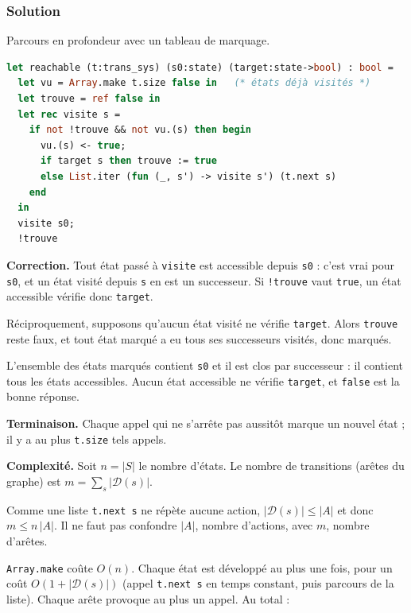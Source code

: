 \documentclass[11pt,a4paper]{article}
\newcommand{\equationajustee}[1]{%
  \sbox{\boiteequation}{$\displaystyle #1$}%
  \ifdim\wd\boiteequation>\linewidth
    \[\resizebox{\linewidth}{!}{\usebox{\boiteequation}}\]%
  \else
    \[#1\]%
  \fi}
\begin{document}
\hypertarget{solution-4}{%
\subsubsection{Solution}\label{solution-4}}

Parcours en profondeur avec un tableau de marquage.

\begin{lstlisting}[language=Caml]
let reachable (t:trans_sys) (s0:state) (target:state->bool) : bool =
  let vu = Array.make t.size false in   (* états déjà visités *)
  let trouve = ref false in
  let rec visite s =
    if not !trouve && not vu.(s) then begin
      vu.(s) <- true;
      if target s then trouve := true
      else List.iter (fun (_, s') -> visite s') (t.next s)
    end
  in
  visite s0;
  !trouve
\end{lstlisting}

\textbf{Correction.} Tout état passé à \texttt{visite} est accessible depuis \texttt{s0} : c'est vrai pour \texttt{s0}, et un état visité depuis \texttt{s} en est un successeur. Si \texttt{!trouve} vaut \texttt{true}, un état accessible vérifie donc \texttt{target}.

Réciproquement, supposons qu'aucun état visité ne vérifie \texttt{target}. Alors \texttt{trouve} reste faux, et tout état marqué a eu tous ses successeurs visités, donc marqués.

L'ensemble des états marqués contient \texttt{s0} et il est clos par successeur : il contient tous les états accessibles. Aucun état accessible ne vérifie \texttt{target}, et \texttt{false} est la bonne réponse.

\textbf{Terminaison.} Chaque appel qui ne s'arrête pas aussitôt marque un nouvel état ; il y a au plus \texttt{t.size} tels appels.

\textbf{Complexité.} Soit \(n=|S|\) le nombre d'états. Le nombre de transitions (arêtes du graphe) est \(m=\sum_s|\mathcal D(s)|\).

Comme une liste \texttt{t.next\ s} ne répète aucune action, \(|\mathcal D(s)|\le|A|\) et donc \(m\le n\,|A|\). Il ne faut pas confondre \(|A|\), nombre d'actions, avec \(m\), nombre d'arêtes.

\texttt{Array.make} coûte \(O(n)\). Chaque état est développé au plus une fois, pour un coût \(O(1+|\mathcal D(s)|)\) (appel \texttt{t.next\ s} en temps constant, puis parcours de la liste). Chaque arête provoque au plus un appel. Au total :

\equationajustee{\boxed{O(n+m)=O(n\,|A|)}}
\end{document}
